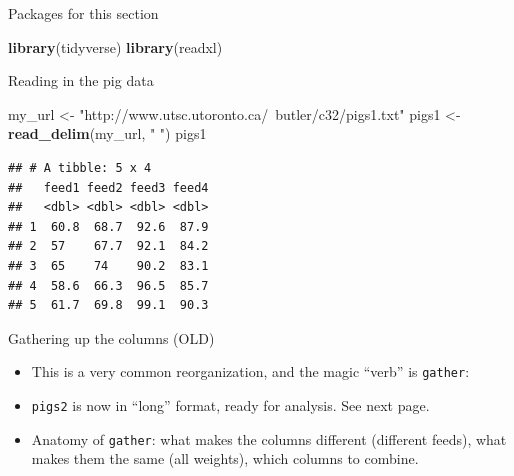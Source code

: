 \documentclass[
  ignorenonframetext,
]{beamer}
\newenvironment{Shaded}{\begin{snugshade}}{\end{snugshade}}
\newcommand{\KeywordTok}[1]{\textcolor[rgb]{0.13,0.29,0.53}{\textbf{#1}}}
\newcommand{\NormalTok}[1]{#1}
\newcommand{\OperatorTok}[1]{\textcolor[rgb]{0.81,0.36,0.00}{\textbf{#1}}}
\newcommand{\StringTok}[1]{\textcolor[rgb]{0.31,0.60,0.02}{#1}}
\providecommand{\tightlist}{%
  \setlength{\itemsep}{0pt}\setlength{\parskip}{0pt}}
\begin{document}
\begin{frame}[fragile]{Packages for this section}
\protect\hypertarget{packages-for-this-section-4}{}

\begin{Shaded}
\begin{Highlighting}[]
\KeywordTok{library}\NormalTok{(tidyverse)}
\KeywordTok{library}\NormalTok{(readxl)}
\end{Highlighting}
\end{Shaded}

\end{frame}

\begin{frame}[fragile]{Reading in the pig data}
\protect\hypertarget{reading-in-the-pig-data}{}

\begin{Shaded}
\begin{Highlighting}[]
\NormalTok{my_url <-}\StringTok{ "http://www.utsc.utoronto.ca/~butler/c32/pigs1.txt"}
\NormalTok{pigs1 <-}\StringTok{ }\KeywordTok{read_delim}\NormalTok{(my_url, }\StringTok{" "}\NormalTok{)}
\NormalTok{pigs1}
\end{Highlighting}
\end{Shaded}

\begin{verbatim}
## # A tibble: 5 x 4
##   feed1 feed2 feed3 feed4
##   <dbl> <dbl> <dbl> <dbl>
## 1  60.8  68.7  92.6  87.9
## 2  57    67.7  92.1  84.2
## 3  65    74    90.2  83.1
## 4  58.6  66.3  96.5  85.7
## 5  61.7  69.8  99.1  90.3
\end{verbatim}

\end{frame}

\begin{frame}[fragile]{Gathering up the columns (OLD)}
\protect\hypertarget{gathering-up-the-columns-old}{}

\begin{itemize}
\tightlist
\item
  This is a very common reorganization, and the magic ``verb'' is
  \texttt{gather}:
\end{itemize}

\begin{Shaded}
\end{Shaded}

\begin{itemize}
\tightlist
\item
  \texttt{pigs2} is now in ``long'' format, ready for analysis. See next
  page.
\item
  Anatomy of \texttt{gather}: what makes the columns different
  (different feeds), what makes them the same (all weights), which
  columns to combine.
\end{itemize}

\end{frame}
\end{document}

